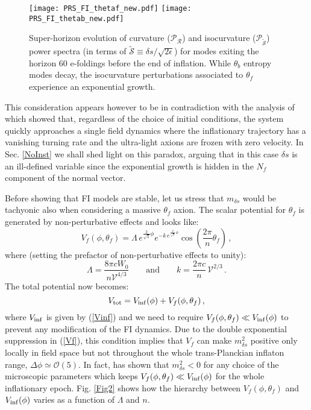 \documentclass[aps,prd,a4paper,twocolumn,amsmath,showpacs,superscriptaddress,nofootinbib,preprintnumbers]{revtex4-1}
\newcommand{\be}{\begin{equation}}
\newcommand{\ee}{\end{equation}}
\newcommand{\mc}{\mathcal}
\newcommand{\vo}{\mathcal{V}}
\begin{document}
\begin{figure}[!htbp]
\centering
\texttt{[image: PRS\_FI\_thetaf\_new.pdf]}
\texttt{[image: PRS\_FI\_thetab\_new.pdf]}
\caption{Super-horizon evolution of curvature ($\mc{P}_{\mc{R}}$) and isocurvature ($\mc{P}_{\tilde{\mc{S}}}$) power spectra (in terms of $\tilde{\mc{S}}\equiv \delta s/\sqrt{2\epsilon}$) for modes exiting the horizon $60$ e-foldings before the end of inflation. While $\theta_b$ entropy modes decay, the isocurvature perturbations associated to $\theta_f$ experience an exponential growth.}
\label{Fig1}
\end{figure}

This consideration appears however to be in contradiction with the analysis of \cite{Cicoli:2018ccr} which showed that, regardless of the choice of initial conditions, the system quickly approaches a single field dynamics where the inflationary trajectory has a vanishing turning rate and the ultra-light axions are frozen with zero velocity. In Sec. \ref{NoInst} we shall shed light on this paradox, arguing that in this case $\delta s$ is an ill-defined variable since the exponential growth is hidden in the $N_f$ component of the normal vector.

Before showing that FI models are stable, let us stress that $m_{\delta s}$ would be tachyonic also when considering a massive $\theta_f$ axion. The scalar potential for $\theta_f$ is generated by non-perturbative effects and looks like:
\be 
V_f (\phi,\theta_f)= \Lambda \,e^{\frac{2}{\sqrt{3}}\phi} e^{-k\, e^{\frac{2}{\sqrt{3}}\phi}}\cos{\left(\frac{2\pi}{n}\theta_f\right)}\,,
\label{Vf}
\ee
where (setting the prefactor of non-perturbative effects to unity):
\be
\Lambda = \frac{8\pi c W_0}{n \vo^{4/3}} \qquad\text{and}\qquad k = \frac{2\pi c}{n}\, \vo^{2/3}\,.
\ee
The total potential now becomes:
\be
V_{\rm tot} = V_{\rm inf}(\phi) + V_f (\phi, \theta_f)\,,
\ee
where $V_{\rm inf}$ is given by (\ref{Vinf}) and we need to require $V_f (\phi,\theta_f)\ll V_{\rm inf}(\phi)$ to prevent any modification of the FI dynamics. Due to the double exponential suppression in (\ref{Vf}), this condition implies that $V_f$ can make $m_{\delta s}^2$ positive only locally in field space but not throughout the whole trans-Planckian inflaton range, $\Delta\phi\simeq \mc{O}(5)$. In fact, \cite{Cicoli:2019ulk} has shown that $m_{\delta s}^2<0$ for any choice of the microscopic parameters which keeps $V_f (\phi,\theta_f)\ll V_{\rm inf}(\phi)$ for the whole inflationary epoch. Fig. \ref{Fig2} shows how the hierarchy between $V_f (\phi,\theta_f)$ and $ V_{\rm inf}(\phi)$ varies as a function of $\Lambda$ and $n$. 
\end{document}
